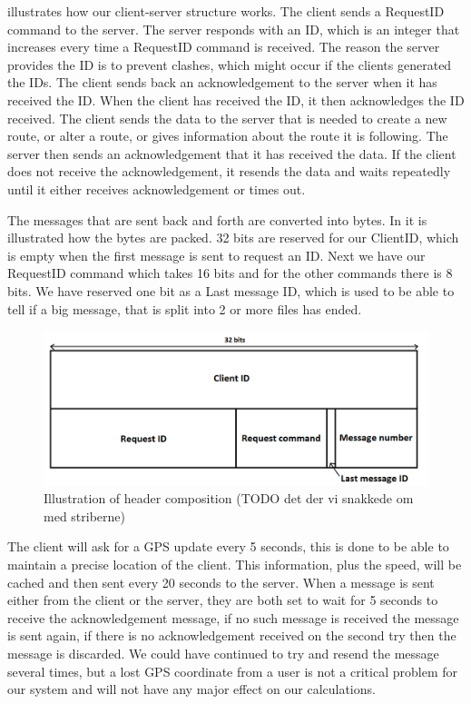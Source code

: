  illustrates how our client-server structure works.
The client sends a RequestID command to the server.
The server responds with an ID, which is an integer that increases every time a RequestID command is received.
The reason the server provides the ID is to prevent clashes, which might occur if the clients generated the IDs.
The client sends back an acknowledgement to the server when it has received the ID.
When the client has received the ID, it then acknowledges the ID received.
The client sends the data to the server that is needed to create a new route,
or alter a route, or gives information about the route it is following.
The server then sends an acknowledgement that it has received the data.
If the client does not receive the acknowledgement,
it resends the data and waits repeatedly until it either receives acknowledgement or times out. 

The messages that are sent back and forth are converted into bytes.
In  it is illustrated how the bytes are packed.
32 bits are reserved for our ClientID, which is empty when the first message is sent to request an ID.
Next we have our RequestID command which takes 16 bits and for the other commands there is 8 bits.
We have reserved one bit as a Last message ID, which is used to be able to tell if a big message,
that is split into 2 or more files has ended.

\begin{figure}[h!]
  \centering
    \includegraphics[width=1\textwidth]{figures/bytesclientserver.png}
    \caption{Illustration of header composition (TODO det der vi snakkede om med striberne)}
    \label{fig:bytesclientserver}
\end{figure}

The client will ask for a GPS update every 5 seconds, this is done to be able to maintain a precise location of the client. This information, plus the speed, will be cached and then sent every 20 seconds to the server.
When a message is sent either from the client or the server,
they are both set to wait for 5 seconds to receive the acknowledgement message, if no such message is received the message is sent again, if there is no acknowledgement received on the second try then the message is discarded. We could have continued to try and resend the message several times, but a lost GPS coordinate from a user is not a critical problem for our system and will not have any major effect on our calculations.		
